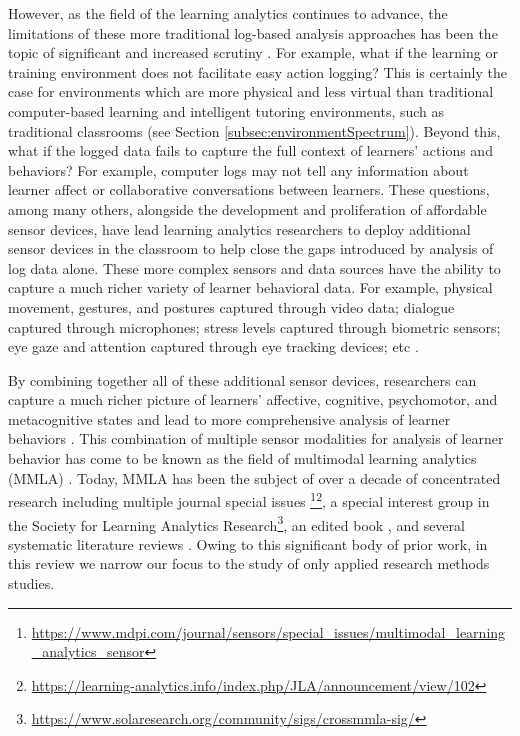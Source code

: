 \documentclass[manuscript,screen,review]{acmart}
\begin{document}
However, as the field of the learning analytics continues to advance, the limitations of these more traditional log-based analysis approaches has been the topic of significant and increased scrutiny \cite{ochoa2017multimodal}. For example, what if the learning or training environment does not facilitate easy action logging? This is certainly the case for environments which are more physical and less virtual than traditional computer-based learning and intelligent tutoring environments, such as traditional classrooms (see Section \ref{subsec:environmentSpectrum}). Beyond this, what if the logged data fails to capture the full context of learners' actions and behaviors? For example, computer logs may not tell any information about learner affect or collaborative conversations between learners. These questions, among many others, alongside the development and proliferation of affordable sensor devices, have lead learning analytics researchers to deploy additional sensor devices in the classroom to help close the gaps introduced by analysis of log data alone. These more complex sensors and data sources have the ability to capture a much richer variety of learner behavioral data. For example, physical movement, gestures, and postures captured through video data; dialogue captured through microphones; stress levels captured through biometric sensors; eye gaze and attention captured through eye tracking devices; etc \cite{vatral2022using}. 

By combining together all of these additional sensor devices, researchers can capture a much richer picture of learners' affective, cognitive, psychomotor, and metacognitive states and lead to more comprehensive analysis of learner behaviors \cite{blikstein2016multimodal}. This combination of multiple sensor modalities for analysis of learner behavior has come to be known as the field of multimodal learning analytics (MMLA) \cite{blikstein2013multimodal, blikstein2016multimodal, worsley_multimodal_2018}. Today, MMLA has been the subject of over a decade of concentrated research including multiple journal special issues \cite{BJETSpecialIssue}\footnote{\href{https://www.mdpi.com/journal/sensors/special_issues/multimodal_learning_analytics_sensor}{https://www.mdpi.com/journal/sensors/special\_issues/multimodal\_learning\_analytics\_sensor}}\footnote{\href{https://learning-analytics.info/index.php/JLA/announcement/view/102}{https://learning-analytics.info/index.php/JLA/announcement/view/102}}, a special interest group in the Society for Learning Analytics Research\footnote{\href{https://www.solaresearch.org/community/sigs/crossmmla-sig/}{https://www.solaresearch.org/community/sigs/crossmmla-sig/}}, an edited book \cite{MMLAHandbook}, and several systematic literature reviews \cite{Chango2022, Alwahaby2022, Shankar2018, Crescenzi2020, Mu2020, DiMitri2018, worsley_multimodal_2018}. Owing to this significant body of prior work, in this review we narrow our focus to the study of only applied research methods studies.
\end{document}
